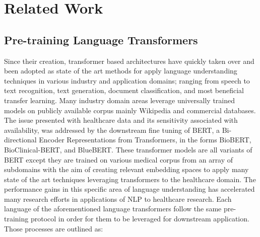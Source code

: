 \documentclass{article}
\begin{document}
\section{Related Work}
\subsection{Pre-training Language Transformers}
Since their creation, transformer based architectures have quickly taken over and been adopted as state of the art methods for apply language understanding techniques in various industry and application domains; ranging from speech to text recognition, text generation, document classification, and most beneficial transfer learning. Many industry  domain areas leverage universally trained models on publicly available  corpus mainly Wikipedia and commercial databases. The issue presented with healthcare data and its sensitivity associated with availability, was addressed by the downstream fine tuning of BERT, a Bi-directional Encoder Representations from  Transformers, in the forms BioBERT, BioClinical-BERT, and BlueBERT. These transformer models are all variants of BERT except they are trained on various medical corpus from an array of subdomains with the aim of creating relevant embedding spaces to apply many state of the art techniques leveraging transformers to the healthcare domain. The performance gains in this specific area of language understanding has accelerated many research efforts in applications of NLP to healthcare research. Each language of the aforementioned language transformers follow the same pre-training protocol in order for them to be leveraged for downstream application. Those processes are outlined as: 
\end{document}
